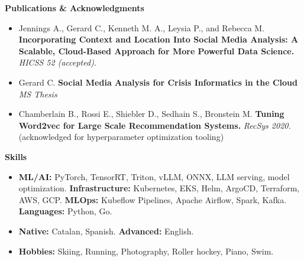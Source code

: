 \documentclass[letterpaper,10pt]{article}
\newcommand{\resitem}[1]{\item #1 \vspace{-2pt}}
\newcommand{\resheading}[1]{{\large \colorbox{mygrey}{\begin{minipage}{\textwidth}{\textbf{#1 \vphantom{p\^{E}}}}\end{minipage}}}}
\begin{document}
\resheading{Publications \& Acknowledgments}
	\begin{itemize}
		\item 	Jennings A., Gerard C., Kenneth M. A., Leysia P., and Rebecca M.  \textbf{Incorporating Context and Location Into Social Media Analysis: A Scalable, Cloud-Based Approach for More Powerful Data Science.}  \textit{HICSS 52 (accepted).}
        \item Gerard C. \textbf{Social Media Analysis for Crisis Informatics in the Cloud} \textit{MS Thesis}
        \item Chamberlain B., Rossi E., Shiebler D., Sedhain S., Bronstein M. \textbf{Tuning Word2vec for Large Scale Recommendation Systems.} \textit{RecSys 2020.} (acknowledged for hyperparameter optimization tooling)
	\end{itemize}


\resheading{Skills}
	\begin{itemize}
		\resitem{\textbf{ML/AI:} PyTorch, TensorRT, Triton, vLLM, ONNX, LLM serving, model optimization. \textbf{Infrastructure:} Kubernetes, EKS, Helm, ArgoCD, Terraform, AWS, GCP. \textbf{MLOps:} Kubeflow Pipelines, Apache Airflow, Spark, Kafka. \textbf{Languages:} Python, Go.}
		\resitem{\textbf{Native:} Catalan, Spanish. \textbf{Advanced:} English.}
		\resitem{\textbf{Hobbies:} Skiing, Running, Photography, Roller hockey, Piano, Swim.}
	\end{itemize}
\end{document}
